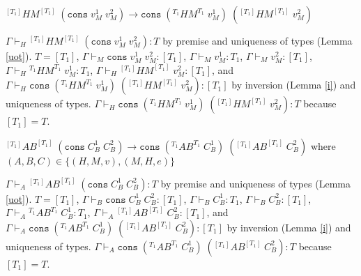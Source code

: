 \begin{case}
$^{[T_{1}]}HM^{[T_{1}]}\;(\mathtt{cons}\;v_{M}^{1}\;v_{M}^{2})\rightarrow\mathtt{cons}\;(^{T_{1}}HM^{T_{1}}\;v_{M}^{1})\;(^{[T_{1}]}HM^{[T_{1}]}\;v_{M}^{2})$

$\Gamma\vdash_{H}{^{[T_{1}]}H}M^{[T_{1}]}\;(\mathtt{cons}\;v_{M}^{1}\;v_{M}^{2}):T$ by premise and uniqueness of types (Lemma \ref{uot}).  $T=[T_{1}]$, $\Gamma\vdash_{M}\mathtt{cons}\;v_{M}^{1}\;v_{M}^{2}:[T_{1}]$, $\Gamma\vdash_{M}v_{M}^{1}:T_{1}$, $\Gamma\vdash_{M}v_{M}^{2}:[T_{1}]$, $\Gamma\vdash_{H}{^{T_{1}}H}M^{T_{1}}\;v_{M}^{1}:T_{1}$, $\Gamma\vdash_{H}{^{[T_{1}]}H}M^{[T_{1}]}\;v_{M}^{2}:[T_{1}]$, and $\Gamma\vdash_{H}\mathtt{cons}\;(^{T_{1}}HM^{T_{1}}\;v_{M}^{1})\;(^{[T_{1}]}HM^{[T_{1}]}\;v_{M}^{2}):[T_{1}]$ by inversion (Lemma \ref{i}) and uniqueness of types.  $\Gamma\vdash_{H}\mathtt{cons}\;(^{T_{1}}HM^{T_{1}}\;v_{M}^{1})\;(^{[T_{1}]}HM^{[T_{1}]}\;v_{M}^{2}):T$ because $[T_{1}]=T$.
\end{case}

\begin{case}
$^{[T_{1}]}AB^{[T_{1}]}\;(\mathtt{cons}\;C_{B}^{1}\;C_{B}^{2})\rightarrow\mathtt{cons}\;(^{T_{1}}AB^{T_{1}}\;C_{B}^{1})\;(^{[T_{1}]}AB^{[T_{1}]}\;C_{B}^{2})$ where $(A,B,C)\in\lbrace(H,M,v),(M,H,e)\rbrace$

$\Gamma\vdash_{A}{^{[T_{1}]}A}B^{[T_{1}]}\;(\mathtt{cons}\;C_{B}^{1}\;C_{B}^{2}):T$ by premise and uniqueness of types (Lemma \ref{uot}).  $T=[T_{1}]$, $\Gamma\vdash_{B}\mathtt{cons}\;C_{B}^{1}\;C_{B}^{2}:[T_{1}]$, $\Gamma\vdash_{B}C_{B}^{1}:T_{1}$, $\Gamma\vdash_{B}C_{B}^{2}:[T_{1}]$, $\Gamma\vdash_{A}{^{T_{1}}A}B^{T_{1}}\;C_{B}^{1}:T_{1}$, $\Gamma\vdash_{A}{^{[T_{1}]}A}B^{[T_{1}]}\;C_{B}^{2}:[T_{1}]$, and $\Gamma\vdash_{A}\mathtt{cons}\;(^{T_{1}}AB^{T_{1}}\;C_{B}^{1})\;(^{[T_{1}]}AB^{[T_{1}]}\;C_{B}^{2}):[T_{1}]$ by inversion (Lemma \ref{i}) and uniqueness of types.  $\Gamma\vdash_{A}\mathtt{cons}\;(^{T_{1}}AB^{T_{1}}\;C_{B}^{1})\;(^{[T_{1}]}AB^{[T_{1}]}\;C_{B}^{2}):T$ because $[T_{1}]=T$.
\end{case}